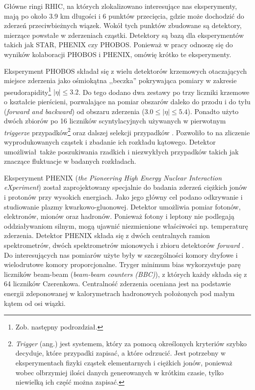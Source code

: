 \documentclass[a4paper,12pt]{article}
\begin{document}
Główne ringi RHIC, na których zlokalizowano interesujące nas eksperymenty, mają po około 3.9 km długości i 6 punktów przecięcia, gdzie może dochodzić do zderzeń przeciwbieżnych wiązek. Wokół tych punktów zbudowane są detektory, mierzące powstałe w zderzeniach cząstki. Detektory są bazą dla eksperymentów takich jak STAR, PHENIX czy PHOBOS. Ponieważ \quad \quad w pracy odnoszę się do wyników kolaboracji PHOBOS i PHENIX, omówię krótko te eksperymenty.

Eksperyment PHOBOS składał się z wielu detektorów krzemowych otaczających miejsce zderzenia jako ośmiokątna ,,beczka'' pokrywająca pomiary w zakresie pseudorapidity\footnote{Zob. następny podrozdział.} $|\eta| \le 3.2$. Do tego dodano dwa zestawy po trzy liczniki krzemowe o kształcie pierścieni, pozwalające na pomiar obszarów daleko do przodu i do tyłu (\textit{forward and backward}) od obszaru zderzenia ($3.0 \le |\eta| \le 5.4$). Ponadto użyto dwóch zbiorów po 16 liczników scyntylacyjnych używanych w pierwotnym \textit{triggerze} przypadków\footnote{\textit{Trigger} (ang.) jest systemem, który za pomocą określonych kryteriów szybko decyduje, które przypadki zapisać, a które odrzucić. Jest potrzebny w eksperymentach fizyki cząstek elementarnych i ciężkich jonów, ponieważ wobec olbrzymiej ilości danych generowanych w krótkim czasie, tylko niewielką ich część można zapisać.} oraz dalszej selekcji przypadków \cite{Back:2004mr}. Pozwoliło to na zliczenie wyprodukowanych cząstek i zbadanie ich rozkładu kątowego. Detektor umożliwiał także poszukiwania rzadkich i niezwykłych przypadków takich jak znaczące fluktuacje w badanych rozkładach.  

Eksperyment PHENIX (\textit{the Pioneering High Energy Nuclear Interaction eXperiment}) został zaprojektowany specjalnie do badania zderzeń ciężkich jonów i protonów przy wysokich energiach. Jako jego główny cel podano odkrywanie i studiowanie plazmy kwarkowo-gluonowej. Detektor umożliwia pomiar fotonów, elektronów, mionów oraz hadronów. Ponieważ fotony \quad \quad \quad \quad i leptony nie podlegają oddziaływaniom silnym, mogą ujawnić niezmienione właściwości np. temperaturę zderzenia. Detektor PHENIX składa się z dwóch centralnych ramion spektrometrów, dwóch spektrometrów mionowych i zbioru detektorów \textit{forward} \cite{Adare:2015bua}. Do interesujących nas pomiarów użyte były w szczególności komory dryfowe i wielodrutowe komory proporcjonalne. Tryger minimum bias wykorzystuje parę liczników beam-beam (\textit{beam-beam counters (BBC)}), z których każdy składa się z 64 liczników Czerenkowa. Centralność zderzenia oceniana jest na podstawie energii zdeponowanej w kalorymetrach hadronowych położonych pod małym kątem od osi wiązki.
\end{document}
